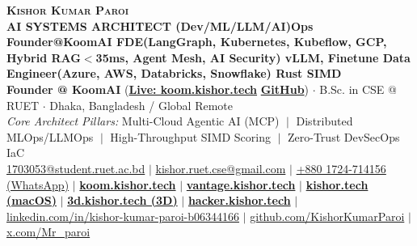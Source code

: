\documentclass[9.5pt,a4paper]{article}
\begin{document}
\begin{center}
    {\fontsize{19.0pt}{21.0pt}\selectfont\color{burgundy}\scshape\bfseries Kishor Kumar Paroi}\\[2.0pt]
    {\fontsize{7.8pt}{9.0pt}\selectfont\textbf{AI SYSTEMS ARCHITECT \;\textbar\; (Dev/ML/LLM/AI)Ops \;\textbar\; Founder@KoomAI \;\textbar\; FDE(LangGraph, Kubernetes, Kubeflow, GCP, Hybrid RAG$<$35ms, Agent Mesh, AI Security) \;\textbar\; vLLM, Finetune \;\textbar\; Data Engineer(Azure, AWS, Databricks, Snowflake) \;\textbar\; Rust SIMD}}\\[2.0pt]
    {\fontsize{8.0pt}{9.2pt}\selectfont
        \textbf{Founder @ KoomAI} (\href{https://koom.kishor.tech/}{\textbf{Live: koom.kishor.tech}} \;\textbar\; \href{https://github.com/KishorKumarParoi/Koom-AI}{\textbf{GitHub}}) \quad$\cdot$\quad
        B.Sc. in CSE @ RUET \quad$\cdot$\quad
        Dhaka, Bangladesh / Global Remote
    }\\[1.8pt]
    {\fontsize{7.2pt}{8.5pt}\selectfont\color{darkgray}
        \textit{Core Architect Pillars:} Multi-Cloud Agentic AI (MCP) $\;\vert\;$ Distributed MLOps/LLMOps $\;\vert\;$ High-Throughput SIMD Scoring $\;\vert\;$ Zero-Trust DevSecOps IaC
    }\\[2.5pt]
    {\fontsize{7.5pt}{8.8pt}\selectfont
        \href{mailto:1703053@student.ruet.ac.bd}{1703053@student.ruet.ac.bd} \quad$\vert$\quad
        \href{mailto:kishor.ruet.cse@gmail.com}{kishor.ruet.cse@gmail.com} \quad$\vert$\quad
        \href{https://wa.me/8801724714156}{+880 1724-714156 (WhatsApp)} \quad$\vert$\quad
        \href{https://koom.kishor.tech/}{\textbf{koom.kishor.tech}} \quad$\vert$\quad
        \href{https://vantage.kishor.tech/}{\textbf{vantage.kishor.tech}} \quad$\vert$\quad
        \href{https://kishor.tech/}{\textbf{kishor.tech (macOS)}} \quad$\vert$\quad
        \href{https://3d.kishor.tech/}{\textbf{3d.kishor.tech (3D)}} \quad$\vert$\quad
        \href{https://hacker.kishor.tech/}{\textbf{hacker.kishor.tech}} \quad$\vert$\quad
        \href{https://linkedin.com/in/kishor-kumar-paroi-b06344166}{linkedin.com/in/kishor-kumar-paroi-b06344166} \quad$\vert$\quad
        \href{https://github.com/KishorKumarParoi}{github.com/KishorKumarParoi} \quad$\vert$\quad
        \href{https://x.com/Mr_paroi}{x.com/Mr\_paroi}
    }
\end{center}
\end{document}
